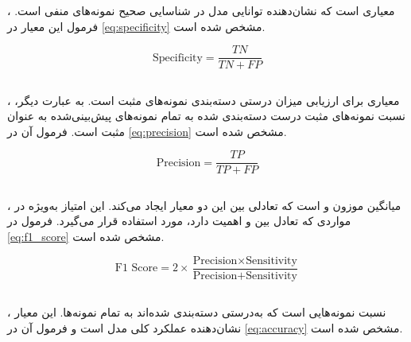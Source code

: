 ، معیاری است که نشان‌دهنده توانایی مدل در شناسایی صحیح نمونه‌های منفی است. فرمول این معیار در \autoref{eq:specificity} مشخص شده است.

\begin{latin}
\begin{equation}
\label{eq:specificity}
\text{Specificity} = \frac{TN}{TN + FP}
\end{equation}
\end{latin}

\subsection{}

، معیاری برای ارزیابی میزان درستی دسته‌بندی نمونه‌های مثبت است. به عبارت دیگر،  نسبت نمونه‌های مثبت درست دسته‌بندی شده به تمام نمونه‌های پیش‌بینی‌شده به عنوان مثبت است. فرمول آن در \autoref{eq:precision} مشخص شده است.

\begin{latin}
\begin{equation}
\label{eq:precision}
\text{Precision} = \frac{TP}{TP + FP}
\end{equation}
\end{latin}

\subsection{}

، میانگین موزون  و  است که تعادلی بین این دو معیار ایجاد می‌کند. این امتیاز به‌ویژه در مواردی که تعادل بین  و  اهمیت دارد، مورد استفاده قرار می‌گیرد. فرمول  در \autoref{eq:f1_score} مشخص شده است.

\begin{latin}
\begin{equation}
\label{eq:f1_score}
\text{F1 Score} = 2 \times \frac{\text{Precision} \times \text{Sensitivity}}{\text{Precision} + \text{Sensitivity}}
\end{equation}
\end{latin}

\subsection{}

، نسبت نمونه‌هایی است که به‌درستی دسته‌بندی شده‌اند به تمام نمونه‌ها. این معیار نشان‌دهنده عملکرد کلی مدل است و فرمول آن در \autoref{eq:accuracy} مشخص شده است.

